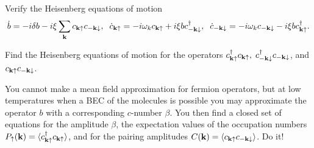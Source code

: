 \documentclass[10pt,letterpaper]{article}
\newcommand{\la}{\langle}
\newcommand{\ra}{\rangle}
\newcommand{\cku}{c_{\ve k\uparrow}}
\newcommand{\cmkd}{c_{-\ve k\downarrow}}
\newcommand{\ve}{\textbf }
\begin{document}
\benum

	\item Verify the Heisenberg equations of motion
	\[\dot b=-i\delta b-i\xi\sum_{\ve k}\cku\cmkd,\;\;\dot c_{\ve k\uparrow}=-i\omega_k\cku+i\xi b\cmkd^\dagger,\;\; \dot c_{-\ve k\downarrow}=-i\omega_k\cmkd-i\xi b\cku^\dagger.\]
	
	\item Find the Heisenberg equations of motion for the operators $\cku^\dagger\cku,\;\cmkd^\dagger\cmkd$, and $\cku\cmkd$.
	
	\item You cannot make a mean field approximation for fermion operators, but at low temperatures when a BEC of the molecules is possible you may approximate the operator $b$ with a corresponding $c$-number $\beta$. You then find a closed set of equations for the amplitude $\beta$, the expectation values of the occupation numbers $P_\uparrow(\ve k)=\la \cku^\dagger\cku\ra$, and for the pairing amplitudes $C(\vect k) = \braket{ \cku\cmkd}$. Do it!

\eenum
\end{document}
